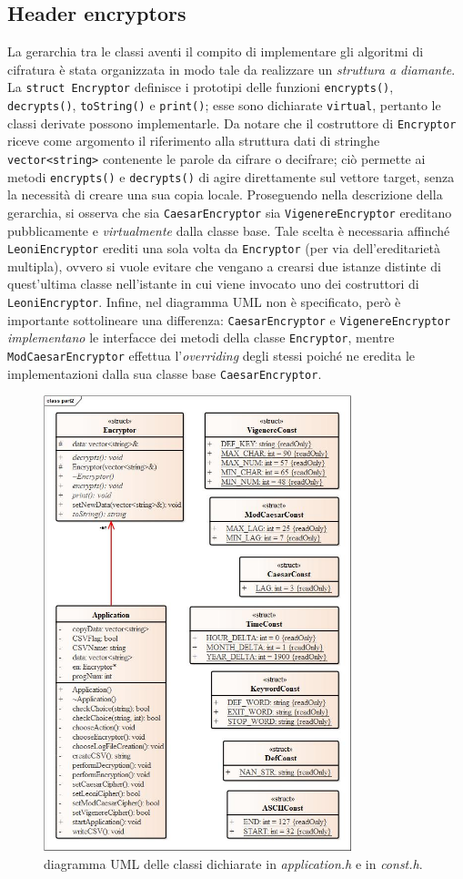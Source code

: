 \documentclass[a4paper, 12pt, one column, aas_macros]{article}
\begin{document}
	\subsection{Header encryptors}
	La gerarchia tra le classi aventi il compito di implementare gli algoritmi di cifratura è stata organizzata in modo tale da realizzare un \textit{struttura a diamante}. La \verb|struct Encryptor| definisce i prototipi delle funzioni \verb|encrypts()|, \verb|decrypts()|, \verb|toString()| e \verb|print()|; esse sono dichiarate \verb|virtual|, pertanto le classi derivate possono implementarle. Da notare che il costruttore di \verb|Encryptor| riceve come argomento il riferimento alla struttura dati di stringhe \verb|vector<string>| contenente le parole da cifrare o decifrare; ciò permette ai metodi \verb|encrypts()| e \verb|decrypts()| di agire direttamente sul vettore target, senza la necessità di creare una sua copia locale. Proseguendo nella descrizione della gerarchia, si osserva che sia \verb|CaesarEncryptor| sia \verb|VigenereEncryptor| ereditano pubblicamente e \textit{virtualmente} dalla classe base. Tale scelta è necessaria affinché \verb|LeoniEncryptor| erediti una sola volta da \verb|Encryptor| (per via dell'ereditarietà multipla), ovvero si vuole evitare che vengano a crearsi due istanze distinte di quest'ultima classe nell'istante in cui viene invocato uno dei costruttori di \verb|LeoniEncryptor|. Infine, nel diagramma UML non è specificato, però è importante sottolineare una differenza: \verb|CaesarEncryptor| e \verb|VigenereEncryptor| \textit{implementano} le interfacce dei metodi della classe \verb|Encryptor|, mentre \verb|ModCaesarEncryptor| effettua l'\textit{overriding} degli stessi poiché ne eredita le implementazioni dalla sua classe base \verb|CaesarEncryptor|.
	
	\begin{figure}[t!]
		\centering
		\includegraphics[height=500px]{UML/UML_2.jpg}
		\caption{diagramma UML delle classi dichiarate in \textit{application.h} e in \textit{const.h}.}
		\label{UML_2}
	\end{figure}
\end{document}
